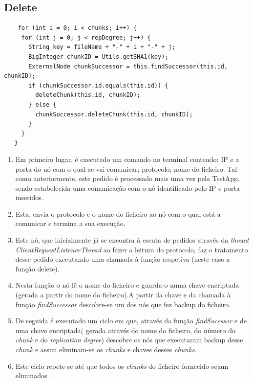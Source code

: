\documentclass[11pt,oneside]{book}
\begin{document}
\subsection{Delete}

\begin{lstlisting}
    for (int i = 0; i < chunks; i++) {
     for (int j = 0; j < repDegree; j++) {
       String key = fileName + "-" + i + "-" + j;
       BigInteger chunkID = Utils.getSHA1(key);
       ExternalNode chunkSuccessor = this.findSuccessor(this.id, chunkID);
       if (chunkSuccessor.id.equals(this.id)) {
         deleteChunk(this.id, chunkID);
       } else {
         chunkSuccessor.deleteChunk(this.id, chunkID);
       }
     }
   }
\end{lstlisting}

\begin{enumerate}
    \item Em primeiro lugar, é executado um comando no terminal contendo: IP e a porta do nó com 
    o qual se vai comunicar; protocolo; nome do ficheiro. Tal como anteriormente, este pedido é 
    processado mais uma vez pela TestApp, sendo estabelecida uma comunicação com o nó 
    identificado pelo IP e porta inseridos.

    \item Esta, envia o protocolo e o nome do ficheiro ao nó com o qual está a comunicar e 
    termina a sua execução.

    \item Este nó, que inicialmente já se encontra à escuta de pedidos através da
    \textit{thread ClientRequestListenerThread} ao fazer a leitura do protocolo, faz o 
    tratamento desse pedido executando uma chamada à função respetiva (neste caso a função delete).

    \item Nesta função o nó lê o nome do ficheiro e guarda-o numa chave encriptada 
    (gerada a partir do nome do ficheiro).A partir da chave e da chamada à função 
    \textit{findSuccessor} descobre-se um dos nós que fez backup do ficheiro.

    \item De seguida é executado um ciclo em que, através da função \textit{findSucessor} e de
    uma chave encriptada( gerada através do nome do ficheiro, do número do \textit{chunk} e do
    \textit{replication degree}) descobre os nós que executaram backup desse \textit{chunk} e 
    assim eliminam-se os \textit{chunks} e chaves desses \textit{chunks}. 
    
    \item Este ciclo repete-se até que todos os \textit{chunks} do ficheiro fornecido sejam 
    eliminados.
\end{enumerate}
\end{document}
